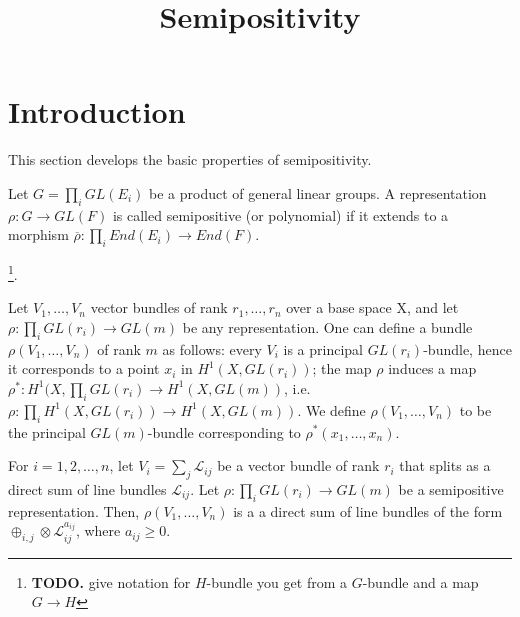 


\newcommand{\todo}[1]{\footnote{\textbf{TODO.} #1}}


\title{Semipositivity}
\maketitle


\section{Introduction}
This section develops the basic properties of semipositivity.


\begin{definition}
Let $G=\prod_i GL(E_i)$ be a product of general linear groups. A representation $\rho:G\rightarrow GL(F)$ is called semipositive (or polynomial) if it extends to a morphism $\overline{\rho}:\prod_i End(E_i)\rightarrow End(F)$.
\end{definition}

\todo{give notation for $H$-bundle you get from a $G$-bundle and a map $G\to H$}.

\begin{definition}
Let $V_1,\dots, V_n$ vector bundles of rank $r_1,\dots, r_n$ over a base space X, and let $\rho:\prod_i GL(r_i)\rightarrow GL(m)$ be any representation. One can define a bundle $\rho(V_1,\dots, V_n)$ of rank $m$ as follows: every $V_i$ is a principal $GL(r_i)$-bundle, hence it corresponds to a point $x_i$ in $H^1(X, GL(r_i))$; the map $\rho$ induces a map $\rho^*:H^1(X,\prod_i GL(r_i)\rightarrow H^1(X, GL(m))$, i.e. $\rho: \prod_i H^1(X,GL(r_i))\rightarrow H^1(X, GL(m))$. We define $\rho(V_1,\dots, V_n)$ to be the principal $GL(m)$-bundle corresponding to $\rho^*(x_1,\dots,x_n)$.
\end{definition}

\begin{lemma}
For $i=1,2,\ldots,n$, let $V_i=\sum_{j}\mathcal{L}_{ij}$ be a vector bundle of rank $r_i$ that splits as a direct sum of line bundles $\mathcal{L}_{ij}$. Let $\rho:\prod_{i}GL(r_i)\to GL(m)$ be a semipositive representation. Then, $\rho(V_1,\ldots,V_n)$ is a a direct sum of line bundles of the form $\oplus_{i,j}\otimes\mathcal{L}_{ij}^{a_{ij}}$, where $a_{ij}\ge0$.
\end{lemma}

